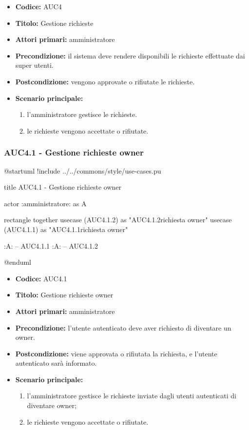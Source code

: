 \documentclass[casi-duso]{subfiles}
\begin{document}
\begin{itemize}
  \item \textbf{Codice:} AUC4
  \item \textbf{Titolo:} Gestione richieste
  \item \textbf{Attori primari:} amministratore
  \item \textbf{Precondizione:} il sistema deve rendere disponibili le richieste effettuate dai super utenti.
  \item \textbf{Postcondizione:} vengono approvate o rifiutate le richieste.
  \item \textbf{Scenario principale:} 
  \begin{enumerate}
    \item l'amministratore gestisce le richieste.
    \item le richieste vengono accettate o rifiutate.
  \end{enumerate}
\end{itemize}

\subsubsection{AUC4.1 - Gestione richieste owner}%
\label{subsub:AUC4.1}

\begin{plantuml}
@startuml
!include ../../commons/style/use-cases.pu

title AUC4.1 - Gestione richieste owner

actor :amministratore: as A

rectangle {
  together {
    usecase (AUC4.1.2) as "AUC4.1.2\nRifiuta richiesta owner"
    usecase (AUC4.1.1) as "AUC4.1.1\nAccetta richiesta owner"
  }
}

:A: -- AUC4.1.1
:A: -- AUC4.1.2

@enduml
\end{plantuml}

\begin{itemize}
  \item \textbf{Codice:} AUC4.1
  \item \textbf{Titolo:} Gestione richieste owner
  \item \textbf{Attori primari:} amministratore
  \item \textbf{Precondizione:} l'utente autenticato deve aver richiesto di diventare un owner.
  \item \textbf{Postcondizione:} viene approvata o rifiutata la richiesta, e l'utente autenticato sarà informato.
  \item \textbf{Scenario principale:} 
  \begin{enumerate}
    \item l'amministratore gestisce le richieste inviate dagli utenti autenticati di diventare owner;
    \item le richieste vengono accettate o rifiutate.
  \end{enumerate}
\end{itemize}
\end{document}
